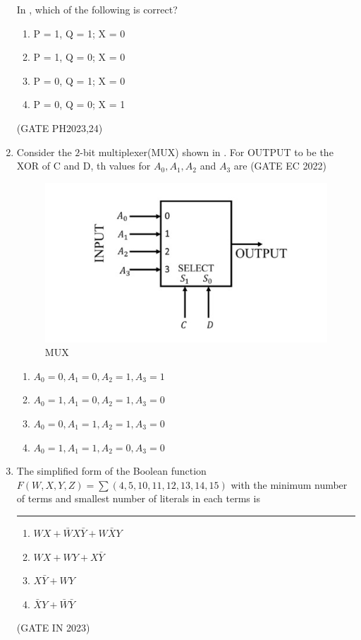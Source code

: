 \begin{enumerate}[label=\arabic*.,ref=\theenumi]
        In , which of the following is correct?
\begin{enumerate}[label=(\alph*)]
    \item P = 1, Q = 1; X = 0
    \item P = 1, Q = 0; X = 0
    \item P = 0, Q = 1; X = 0
    \item P = 0, Q = 0; X = 1
\end{enumerate}
\hfill(GATE PH2023,24)

\item
	 Consider the $2$-bit multiplexer(MUX) shown in  
		 .
	  For OUTPUT to be the XOR of C and D, th values for $A_0,A_1,A_2$ and $A_3$  are \underline{\hspace{20pt}}  \hfill(GATE EC 2022)
	

	 \begin{figure}[!ht]
		 \centering
		\includegraphics[width=\columnwidth]{figs/gatepic19.jpg}
		\caption{MUX}
		 \label{fig:MUX}
	\end{figure}
	 \begin{enumerate}[label=(\Alph*)]
		\item $A_0=0,A_1=0,A_2=1,A_3=1$
		\item $A_0=1,A_1=0,A_2=1,A_3=0$
		\item $A_0=0,A_1=1,A_2=1,A_3=0$
		\item $A_0=1,A_1=1,A_2=0,A_3=0$
	\end{enumerate}

 \item The simplified form of the Boolean function $F(W,X,Y,Z)=\sum(4,5,10,11,12,13,14,15)$ with the minimum number of terms and smallest number of literals in each terms is \rule{60pt}{1pt}
	  \begin{enumerate}
		  \item $WX+\bar WX\bar Y+W\bar XY$
		   \item $WX+WY+X\bar Y$
		     \item $X\bar Y+WY$
		      \item$\bar XY+\bar W\bar Y$
	\end{enumerate}
 \hfill{(GATE IN 2023)}


\end{enumerate}
